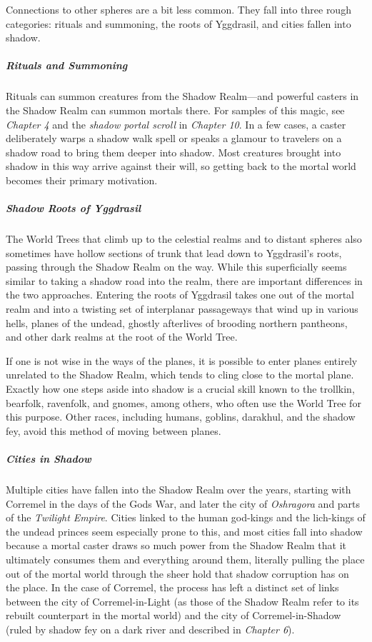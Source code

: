 \documentclass[10pt,a4paper,twoside,bg=print,twocolumn,openany,nodeprecatedcode]{dndbook}
\begin{document}
Connections to other spheres are a bit less common. They fall into three rough categories: rituals and summoning, the roots of Yggdrasil, and cities fallen into shadow.

\subparagraph{Rituals and Summoning}
Rituals can summon creatures from the Shadow Realm—and powerful casters in the Shadow Realm can summon mortals there. For samples of this magic, see \textit{Chapter 4} and the \textit{shadow portal scroll} in \textit{Chapter 10}. In a few cases, a caster deliberately warps a shadow walk spell or speaks a glamour to travelers on a shadow road to bring them deeper into shadow. Most creatures brought into shadow in this way arrive against their will, so getting back to the mortal world becomes their primary motivation.

\subparagraph{Shadow Roots of Yggdrasil}
The World Trees that climb up to the celestial realms and to distant spheres also sometimes have hollow sections of trunk that lead down to Yggdrasil's roots, passing through the Shadow Realm on the way. While this superficially seems similar to taking a shadow road into the realm, there are important differences in the two approaches. Entering the roots of Yggdrasil takes one out of the mortal realm and into a twisting set of interplanar passageways that wind up in various hells, planes of the undead, ghostly afterlives of brooding northern pantheons, and other dark realms at the root of the World Tree.

If one is not wise in the ways of the planes, it is possible to enter planes entirely unrelated to the Shadow Realm, which tends to cling close to the mortal plane. Exactly how one steps aside into shadow is a crucial skill known to the trollkin, bearfolk, ravenfolk, and gnomes, among others, who often use the World Tree for this purpose. Other races, including humans, goblins, darakhul, and the shadow fey, avoid this method of moving between planes.

\subparagraph{Cities in Shadow}
Multiple cities have fallen into the Shadow Realm over the years, starting with Corremel in the days of the Gods War, and later the city of \textit{Oshragora} and parts of the \textit{Twilight Empire}. Cities linked to the human god-kings and the lich-kings of the undead princes seem especially prone to this, and most cities fall into shadow because a mortal caster draws so much power from the Shadow Realm that it ultimately consumes them and everything around them, literally pulling the place out of the mortal world through the sheer hold that shadow corruption has on the place. In the case of Corremel, the process has left a distinct set of links between the city of Corremel-in-Light (as those of the Shadow Realm refer to its rebuilt counterpart in the mortal world) and the city of Corremel-in-Shadow (ruled by shadow fey on a dark river and described in \textit{Chapter 6}).
\end{document}
